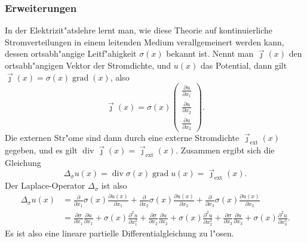 \subsubsection{Erweiterungen}
In der Elektrizit"atslehre lernt man, wie diese Theorie auf kontinuierliche
Stromverteilungen in einem leitenden Medium verallgemeinert werden kann,
dessen ortsabh"angige Leitf"ahigkeit $\sigma(x)$ bekannt ist.
Nennt man $\vec\jmath(x)$ den ortsabh"angigen
Vektor der Stromdichte, und $u(x)$ das Potential, dann gilt
$\vec\jmath(x)=\sigma(x)\operatorname{grad}(x)$, also
\[
\vec\jmath(x)=\sigma(x)\begin{pmatrix}
\frac{\partial u}{\partial x_1}\\
\frac{\partial u}{\partial x_2}\\
\frac{\partial u}{\partial x_3}
\end{pmatrix}.
\]
Die externen Str"ome sind dann durch eine externe Stromdichte
$\vec\jmath_{\text{ext}}(x)$ gegeben, und es gilt
$\operatorname{div}\vec\jmath(x)=\vec\jmath_{\text{ext}}(x)$. Zusammen ergibt
sich die Gleichung
\[
\Delta_{\sigma}u(x)=\operatorname{div}\sigma(x)\operatorname{grad} u(x)=\vec\jmath_{\text{ext}}(x).
\]
Der Laplace-Operator $\Delta_\sigma$ ist also
\begin{align*}
\Delta_\sigma u(x)&=
\frac{\partial}{\partial x_1}\sigma(x)\frac{\partial u(x)}{\partial x_1}
+
\frac{\partial}{\partial x_2}\sigma(x)\frac{\partial u(x)}{\partial x_2}
+
\frac{\partial}{\partial x_3}\sigma(x)\frac{\partial u(x)}{\partial x_3}
\\
&=
\frac{\partial\sigma}{\partial x_1}\frac{\partial u}{\partial x_1}
+\sigma(x)\frac{\partial^2 u}{\partial x_1^2}+
\frac{\partial\sigma}{\partial x_2}\frac{\partial u}{\partial x_2}
+\sigma(x)\frac{\partial^2 u}{\partial x_2^2}+
\frac{\partial\sigma}{\partial x_3}\frac{\partial u}{\partial x_3}
+\sigma(x)\frac{\partial^2 u}{\partial x_3^2}.
\end{align*}
Es ist also eine lineare partielle Differentialgleichung zu l"osen.

